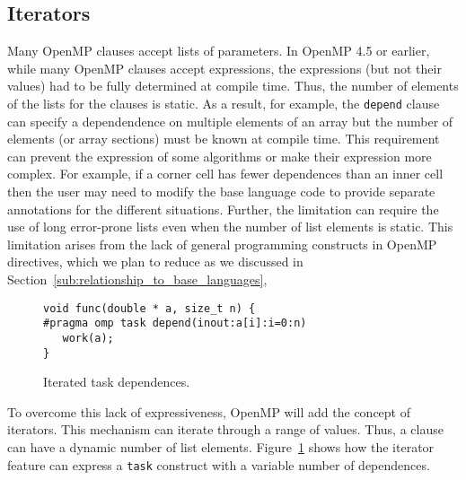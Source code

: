 \subsection{Iterators}
\label{sub:iterators}

Many OpenMP clauses accept lists of parameters. In OpenMP 4.5 or earlier, 
while many OpenMP clauses accept expressions, the expressions (but not 
their values) had to be fully determined at compile time. Thus, the number 
of elements of the lists for the clauses is static. As a result, for example,
the \texttt{depend} clause can specify a dependendence on multiple elements
of an array but the number of elements (or array sections) must be known
at compile time. This requirement can prevent the expression of some
algorithms or make their expression more complex.  For example, if a 
corner cell has fewer dependences than an inner cell then the user may need 
to modify the base language code to provide separate annotations for the
different situations. Further, the limitation can require the use of long 
error-prone lists even when the number of list elements is static. This 
limitation arises from the lack of general programming constructs in 
OpenMP directives, which we plan to reduce as we discussed in 
Section~\ref{sub:relationship_to_base_languages}, 

\begin{figure}
\begin{verbatim}
void func(double * a, size_t n) {
#pragma omp task depend(inout:a[i]:i=0:n)
   work(a);
}
\end{verbatim}
\caption{Iterated task dependences.\label{fig:iterators}}
\end{figure}

To overcome this lack of expressiveness, OpenMP will add the concept of  
iterators. This mechanism can iterate through a range of values. Thus, a
clause can have a dynamic number of list elements. Figure~\ref{fig:iterators} 
shows how the iterator feature can express a \texttt{task} construct with a 
variable number of dependences.
